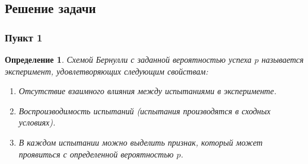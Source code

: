 \documentclass[oneside, final, 12pt]{article}
\newtheorem{definition}{Определение}
\begin{document}
\subsection{Решение задачи}
\subsubsection{Пункт 1}
    \begin{definition}
    Схемой Бернулли с заданной вероятностью успеха $p$ называется эксперимент, удовлетворяющих следующим свойствам:
        \begin{enumerate}
            \item Отсутствие взаимного влияния между испытаниями в эксперименте.
            \item Воспроизводимость испытаний (испытания производятся в сходных условиях).
            \item В каждом испытании можно выделить признак, который может проявиться с определенной
		вероятностью $p$.
        \end{enumerate}
    \end{definition}
    
\end{document}
